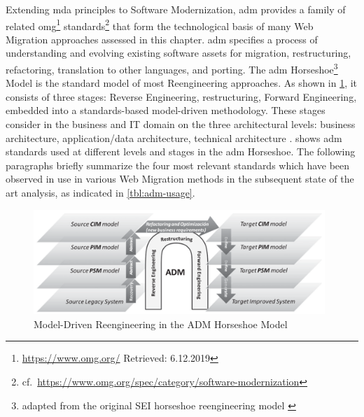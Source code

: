 Extending \gls{mda} \autocite{OMG2014MDA} principles to \gls{Software Modernization}, \gls{adm} provides a family of related \gls{omg}\footnote{\url{https://www.omg.org/} Retrieved: 6.12.2019} standards\footnote{cf.~\url{https://www.omg.org/spec/category/software-modernization}} that form the technological basis of many \gls{Web Migration} approaches assessed in this chapter.
\gls{adm} specifies a process of understanding and evolving existing software assets for migration, restructuring, refactoring, translation to other languages, and porting.
The \gls{adm} Horseshoe\footnote{adapted from the original SEI horseshoe reengineering model \autocite{Kazman1998Horseshoe}} Model \autocite{Perez-Castillo2011KDM,Perez-Castillo2011MARBLE,Khusidman2007} is the standard model of most \gls{Reengineering} approaches.
As shown in \cref{fig:adm-horseshoe-a}, it consists of three stages: \gls{Reverse Engineering}, restructuring, \gls{Forward Engineering}, embedded into a standards-based model-driven methodology.
These stages consider  in the business and IT domain on the three architectural levels: business architecture, application/data architecture, technical architecture \autocite{OMG2008ADMWhitepaper}.
 shows \gls{adm} standards used at different levels and stages in the \gls{adm} Horseshoe.
The following paragraphs briefly summarize the four most relevant standards which have been observed in use in various \gls{Web Migration} methods in the subsequent state of the art analysis, as indicated in \cref{tbl:adm-usage}.
\begin{figure}[hbt]
\hypertarget{fig:adm-horseshoe-a}{%
\centering%
\includegraphics[width=0.98\textwidth]{../figures/adm_horseshoe_1.png}%
\caption[Model-Driven Reengineering in the ADM Horseshoe Model]{Model-Driven Reengineering in the ADM Horseshoe Model \autocite{Perez-Castillo2011MARBLE}}%
\label{fig:adm-horseshoe-a}%
}
\end{figure}
